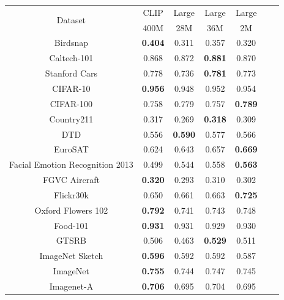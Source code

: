 \begin{table}[]
\centering
\begin{tabular}{c|cccccc}\hline                     
\multirow{2}{*}{Dataset}               & CLIP & Large  & Large & Large \\
& 400M & 28M & 36M & 2M \\\hline

Birdsnap                & \textbf{0.404}    & 0.311    & 0.357           & 0.320      \\
Caltech-101               & 0.868    & 0.872    & \textbf{0.881}           & 0.870      \\
Stanford Cars               & 0.778    & 0.736    & \textbf{0.781}           & 0.773      \\
CIFAR-10                     & \textbf{0.956}    & 0.948    & 0.952           & 0.954      \\
CIFAR-100                 & 0.758    & 0.779    & 0.757           & \textbf{0.789}      \\
Country211             & 0.317    & 0.269    & \textbf{0.318}           & 0.309      \\
DTD                    & 0.556    & \textbf{0.590}    & 0.577           & 0.566      \\
EuroSAT              & 0.624    & 0.643    & 0.657           & \textbf{0.669}      \\
Facial Emotion Recognition 2013                  & 0.499    & 0.544    & 0.558           & \textbf{0.563}      \\
FGVC Aircraft           & \textbf{0.320}    & 0.293    & 0.310           & 0.302      \\
Flickr30k            & 0.650    & 0.661    & 0.663           & \textbf{0.725}      \\
Oxford Flowers 102           & \textbf{0.792}    & 0.741    & 0.743           & 0.748      \\
Food-101                 & \textbf{0.931}    & 0.931    & 0.929           & 0.930      \\
GTSRB                  & 0.506    & 0.463    & \textbf{0.529}           & 0.511      \\
ImageNet Sketch       & \textbf{0.596}    & 0.592    & 0.592           & 0.587      \\
ImageNet               & \textbf{0.755}    & 0.744    & 0.747           & 0.745      \\
Imagenet-A                & \textbf{0.706}    & 0.695    & 0.704           & 0.695      \\

\end{tabular}
\end{table}
